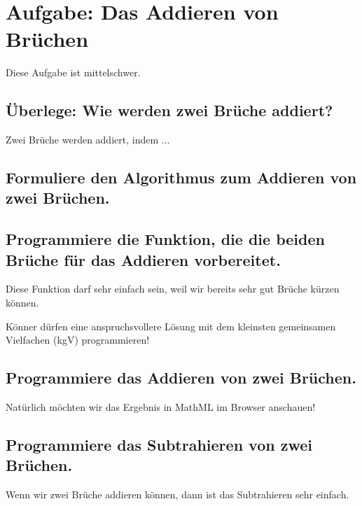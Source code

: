 \section{Aufgabe: Das Addieren von Brüchen}

Diese Aufgabe ist mittelschwer.

\subsection{Überlege: Wie werden zwei Brüche addiert?}

Zwei Brüche werden addiert, indem $\dots$

\subsection{Formuliere den Algorithmus zum Addieren von zwei Brüchen.}

\subsection{Programmiere die Funktion, die die beiden Brüche für das Addieren vorbereitet.}

Diese Funktion darf sehr einfach sein, weil wir bereits sehr gut Brüche kürzen können.

Könner dürfen eine anspruchsvollere Lösung mit dem kleinsten gemeinsamen Vielfachen (kgV) programmieren!

\subsection{Programmiere das Addieren von zwei Brüchen.}

Natürlich möchten wir das Ergebnis in MathML im Browser anschauen!

\subsection{Programmiere das Subtrahieren von zwei Brüchen.}

Wenn wir zwei Brüche addieren können, dann ist das Subtrahieren sehr einfach.